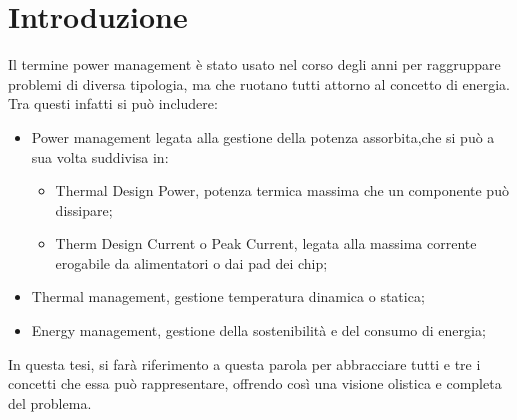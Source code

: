 \chapter{Introduzione}
Il termine power management è stato usato nel corso degli anni per raggruppare problemi di diversa tipologia, ma che ruotano tutti attorno al concetto di energia.
Tra questi infatti si può includere:
\begin{itemize}
    \item Power management legata alla gestione della potenza assorbita,che si può a sua volta suddivisa in:
    \begin{itemize}
        \item Thermal Design Power, potenza termica massima che un componente può dissipare;
        \item Therm Design Current o Peak Current, legata alla massima corrente erogabile da alimentatori o dai pad dei chip; %
    \end{itemize}
    \item Thermal management, gestione temperatura dinamica o statica;
    \item Energy management, gestione della sostenibilità e del consumo di energia;
\end{itemize}

In questa tesi, si farà riferimento a questa parola per abbracciare tutti e tre i concetti che essa può rappresentare, offrendo così una visione olistica e completa del problema.

